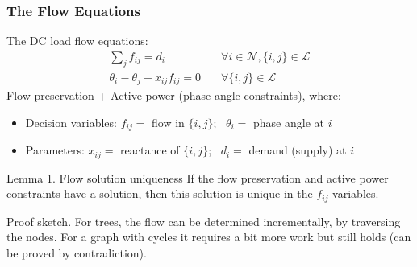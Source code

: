 \documentclass{beamer}
\begin{document}

\begin{frame}
\frametitle{The Flow Equations}\footnotesize
The DC load flow equations:
\begin{align*}
	\sum_j{f_{ij}} = d_i & \quad\forall i\in\mathcal{N}, \{i,j\}\in\mathcal{L}\\
	\theta_i-\theta_j-x_{ij}f_{ij}=0 & \quad\forall \{i,j\}\in\mathcal{L}
\end{align*}
Flow preservation + Active power (phase angle constraints), where:
\begin{itemize}
	\item Decision variables: $f_{ij}=$ flow in $\{i,j\}$; \ $\theta_i=$ phase angle at $i$
	\item Parameters: $x_{ij}=$ reactance of $\{i,j\}$; \ $d_i=$ demand (supply) at $i$
\end{itemize}

\begin{block}{\small Lemma 1. Flow solution uniqueness}
If the flow preservation and active power constraints have a solution, then this solution is unique in the $f_{ij}$ variables.
\end{block}
Proof sketch. For trees, the flow can be determined incrementally, by traversing the nodes. For a graph with cycles it requires a bit more work but still holds (can be proved by contradiction).
\end{frame}
\end{document}
